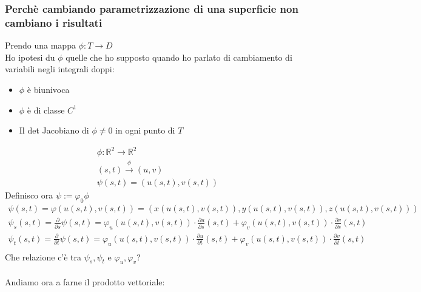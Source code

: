 \documentclass[a4paper, oneside]{article}
\begin{document}
\subsubsection{Perchè cambiando parametrizzazione di una superficie non cambiano i risultati}
Prendo una mappa $\phi : T \to D$\\
Ho ipotesi du $\phi$ quelle che ho supposto quando ho parlato di cambiamento di variabili negli integrali doppi:
\begin{itemize}
  \item $\phi$ è biunivoca
  \item $\phi$ è di classe $C^1$
  \item Il det Jacobiano di $\phi \neq 0$ in ogni punto di $T$
\end{itemize}
\begin{gather*}
  \phi : \mathbb{R}^2 \to \mathbb{R}^2\\
  (s,t) \overset{\phi}{\to} (u, v)\\
  \psi (s,t) = (u(s,t), v(s,t))
\end{gather*}
Definisco ora $\psi := \varphi_0 \phi$
\begin{gather*}
  \psi (s,t) = \varphi (u(s,t), v(s,t)) = (x(u(s,t), v(s,t)), y(u(s,t), v(s,t)), z(u(s,t), v(s,t)))\\
  \psi_s (s,t) = \frac{\partial}{\partial s} \psi(s,t) = \varphi_u (u(s,t), v(s,t)) \cdot \frac{\partial u}{\partial s} (s,t) + \varphi_v (u(s,t), v(s,t)) \cdot \frac{\partial v}{\partial s}(s,t)\\
  \psi_t (s,t) = \frac{\partial}{\partial t} \psi(s,t) = \varphi_u (u(s,t), v(s,t)) \cdot \frac{\partial u}{\partial t} (s,t) + \varphi_v (u(s,t), v(s,t)) \cdot \frac{\partial v}{\partial t}(s,t)\\
\end{gather*}
Che relazione c'è tra $\psi_s, \psi_t$ e $\varphi_u, \varphi_v$?\\
\hfill\\
Andiamo ora a farne il prodotto vettoriale:
\end{document}
